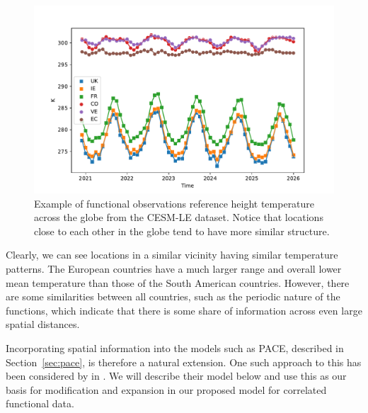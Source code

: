  \begin{figure}[htbp!] 
	\centering    
	\includegraphics[width=1.0\textwidth]{TREFHT_example_space_temp}
	\caption[An example of spatial correlation in the TREFHT variable from the CESM-LE dataset.]{Example of functional observations reference height temperature across the globe from the CESM-LE dataset. Notice that locations close to each other in the globe tend to have more similar structure.}
	\label{fig:cesm-space}
\end{figure}
Clearly, we can see locations in a similar vicinity having similar temperature patterns.
The European countries have a much larger range and overall lower mean temperature than those of the South American countries.
However, there are some similarities between all countries, such as the periodic nature of the functions, which indicate that there is some share of information across even large spatial distances. 

Incorporating spatial information into the models such as PACE, described in Section~\ref{sec:pace}, is therefore a natural extension. 
One such approach to this has been considered by \citeauthor{liu_functional_2017} in \citep{liu_functional_2017}. 
We will describe their model below and use this as our basis for modification and expansion in our proposed model for correlated functional data.

